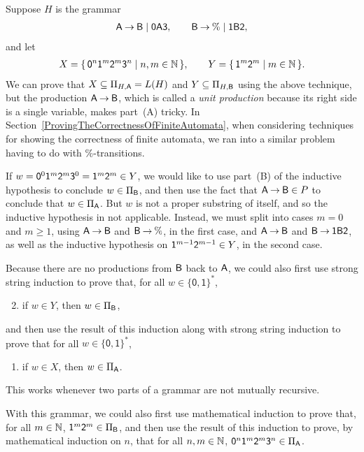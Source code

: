 Suppose $H$ is the grammar
\begin{gather*}
\mathsf{A} \mathbin{\to} \mathsf{B} \mid \mathsf{0}\mathsf{A}\mathsf{3} , \qquad
\mathsf{B} \mathbin{\to} \% \mid \mathsf{1}\mathsf{B}\mathsf{2} ,
\end{gather*}
and let
\begin{gather*}
X = \{ \, \mathsf{0}^n\mathsf{1}^m\mathsf{2}^m\mathsf{3}^n \mid n,m\in\mathbb{N} \, \} , \qquad
Y = \{ \, \mathsf{1}^m\mathsf{2}^m \mid m\in\mathbb{N} \, \} .
\end{gather*}
We can prove that $X\subseteq \Pi_{H,\mathsf{A}} = L(H)$ and $Y\subseteq \Pi_{H,\mathsf{B}}$
using the above technique, but the production $\mathsf{A}\mathbin{\to}\mathsf{B}$, which is
called a \emph{unit production} because its right side is a single
variable, makes part~(A) tricky.  In
Section~\ref{ProvingTheCorrectnessOfFiniteAutomata}, when considering
techniques for showing the correctness of finite automata, we ran into
a similar problem having to do with $\%$-transitions.

If $w=\mathsf{0}^0\mathsf{1}^m\mathsf{2}^m\mathsf{3}^0 = \mathsf{1}^m\mathsf{2}^m\in Y$, we
would like to use part~(B) of the inductive hypothesis to conclude
$w\in\Pi_{\mathsf{B}}$, and then use the fact that $\mathsf{A}\mathbin{\to}\mathsf{B}\in P$ to
conclude that $w\in\Pi_{\mathsf{A}}$.  But $w$ is not a proper substring of
itself, and so the inductive hypothesis in not applicable.  Instead,
we must split into cases $m=0$ and $m\geq 1$, using $\mathsf{A}\mathbin{\to}\mathsf{B}$ and
$\mathsf{B}\mathbin{\to}\%$, in the first case, and $\mathsf{A}\mathbin{\to}\mathsf{B}$ and
$\mathsf{B}\mathbin{\to}\mathsf{1}\mathsf{B}\mathsf{2}$, as well as the inductive hypothesis on
$\mathsf{1}^{m-1}\mathsf{2}^{m-1}\in Y$, in the second case.

Because there are no productions from $\mathsf{B}$ back to $\mathsf{A}$, we could
also first use strong string induction to prove that, for all
$w\in\mathsf{\{0,1\}^*}$,
\begin{enumerate}[\quad(A)]
\setcounter{enumi}{1}
\item if $w\in Y$, then $w\in\Pi_{\mathsf{B}}$,
\end{enumerate}
and then use the result of this induction along with
strong string induction to prove that
for all $w\in\mathsf{\{0,1\}^*}$,
\begin{enumerate}[\quad(A)]
\item if $w\in X$, then $w\in\Pi_{\mathsf{A}}$.
\end{enumerate}
This works whenever two parts of a grammar are not mutually recursive.

With this grammar, we could also first use mathematical induction to
prove that, for all $m\in\mathbb{N}$, $\mathsf{1}^m\mathsf{2}^m\in\Pi_{\mathsf{B}}$, and
then use the result of this induction to prove, by mathematical
induction on $n$, that for all $n,m\in\mathbb{N}$,
$\mathsf{0}^n\mathsf{1}^m\mathsf{2}^m\mathsf{3}^n\in\Pi_{\mathsf{A}}$.

